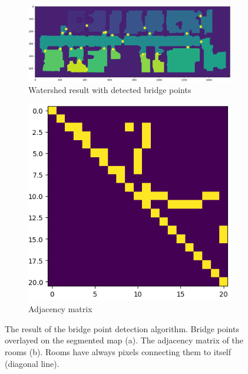 \begin{figure}[h]
    \captionsetup[subfigure]{justification=centering}
    \centering
    \begin{subfigure}{.65\textwidth}
      \centering
      \includegraphics[width=\textwidth]{figures/50_implementation/ryu_bridge_nodes.png}
      \caption{Watershed result with detected bridge points}
    \end{subfigure}%
    \begin{subfigure}{.25\textwidth}
      \centering
      \includegraphics[width=\textwidth]{figures/50_implementation/ryu_adjacency_matrix.png}
      \caption{Adjacency matrix}
    \end{subfigure}
    \caption[The result of the bridge point detection algorithm]{The result of the bridge point detection algorithm. Bridge points overlayed on the segmented map (a). The adjacency matrix of the rooms (b). Rooms have always pixels connecting them to itself (diagonal line).}
    \label{fig:bridge_nodes}
\end{figure}

